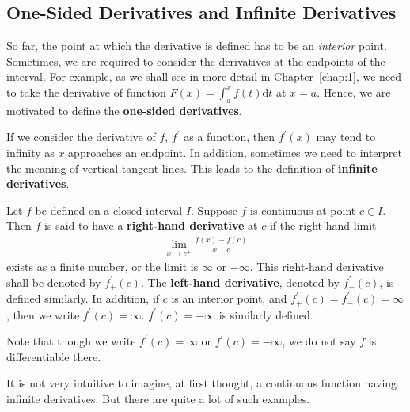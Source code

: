 \documentclass[thmcnt=section, 12pt]{my-elegantbook}
\begin{document}

\subsection{One-Sided Derivatives and Infinite Derivatives}

So far, the point at which the derivative is defined has to be an \textit{interior} point. Sometimes, we are required to consider the derivatives at the endpoints of the interval. For example, as we shall see in more detail in Chapter~\ref{chap:1}, we need to take the derivative of function $F(x) = \int_a^x f(t) \mathrm{d}t$ at $x=a$. Hence, we are motivated to define the \textbf{one-sided derivatives}. 

If we consider the derivative of $f$, $f^\prime$ as a function, then $f^\prime(x)$ may tend to infinity as $x$ approaches an endpoint. In addition, sometimes we need to interpret the meaning of vertical tangent lines. This leads to the definition of \textbf{infinite derivatives}.

\begin{definition}
    Let $f$ be defined on a closed interval $I$. Suppose $f$ is continuous at point $c \in I$. Then $f$ is said to have a \textbf{right-hand derivative} at $c$ if the right-hand limit 
    \begin{align*}
        \lim_{x \to c^{+}} \frac{f(x) - f(c)}{x - c}
    \end{align*}
    exists as a finite number, or the limit is $\infty$ or $-\infty$. This right-hand derivative shall be denoted by $f^\prime_{+}(c)$. The \textbf{left-hand derivative}, denoted by $f^\prime_{-}(c)$, is defined similarly. In addition, if $c$ is an interior point, and $f^\prime_{+}(c) = f^\prime_{-}(c) = \infty$, then we write $f^\prime(c) = \infty$. $f^\prime(c) = -\infty$ is similarly defined.
\end{definition}

\begin{remark}
    Note that though we write $f^\prime(c) = \infty$ or $f^\prime(c) = -\infty$, we do not say $f$ is differentiable there.
\end{remark}

It is not very intuitive to imagine, at first thought, a continuous function having infinite derivatives. But there are quite a lot of such examples.
\end{document}
